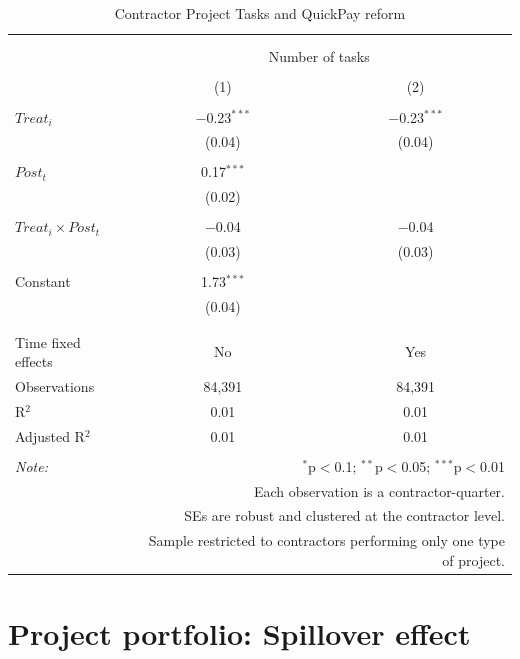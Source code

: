 \documentclass[
]{article}
\begin{document}
\begin{table}[H] \centering 
  \caption{Contractor Project Tasks and QuickPay reform} 
  \label{} 
\small 
\begin{tabular}{@{\extracolsep{-2pt}}lcc} 
\\[-1.8ex]\hline 
\hline \\[-1.8ex] 
\\[-1.8ex] & \multicolumn{2}{c}{Number of tasks} \\ 
\\[-1.8ex] & (1) & (2)\\ 
\hline \\[-1.8ex] 
 $Treat_i$ & $-$0.23$^{***}$ & $-$0.23$^{***}$ \\ 
  & (0.04) & (0.04) \\ 
  & & \\ 
 $Post_t$ & 0.17$^{***}$ &  \\ 
  & (0.02) &  \\ 
  & & \\ 
 $Treat_i \times Post_t$ & $-$0.04 & $-$0.04 \\ 
  & (0.03) & (0.03) \\ 
  & & \\ 
 Constant & 1.73$^{***}$ &  \\ 
  & (0.04) &  \\ 
  & & \\ 
\hline \\[-1.8ex] 
Time fixed effects & No & Yes \\ 
Observations & 84,391 & 84,391 \\ 
R$^{2}$ & 0.01 & 0.01 \\ 
Adjusted R$^{2}$ & 0.01 & 0.01 \\ 
\hline 
\hline \\[-1.8ex] 
\textit{Note:}  & \multicolumn{2}{r}{$^{*}$p$<$0.1; $^{**}$p$<$0.05; $^{***}$p$<$0.01} \\ 
 & \multicolumn{2}{r}{Each observation is a contractor-quarter.} \\ 
 & \multicolumn{2}{r}{SEs are robust and clustered at the contractor level.} \\ 
 & \multicolumn{2}{r}{Sample restricted to contractors performing only one type of project.} \\ 
\end{tabular} 
\end{table}

\hypertarget{project-portfolio-spillover-effect}{%
\section{Project portfolio: Spillover
effect}\label{project-portfolio-spillover-effect}}
\end{document}
